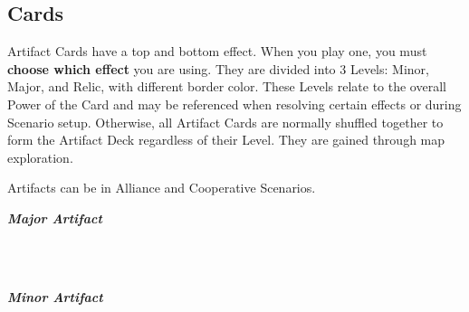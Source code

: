 \begin{multicols*}{2}
\clearpage

\subsection*{ Cards}

Artifact Cards have a top and bottom effect. When you play one, you must \textbf{choose which effect} you are using.
They are divided into 3 Levels: Minor, Major, and Relic, with different border color.
These Levels relate to the overall Power of the Card and may be referenced when resolving certain effects or during Scenario setup.
Otherwise, all Artifact Cards are normally shuffled together to form the Artifact Deck regardless of their Level.
They are gained through map exploration.\par
Artifacts can be  in Alliance and Cooperative Scenarios.\par
\begin{multicols*}{2}
  \begin{scriptsize}
  \end{scriptsize}
  \footnotesize
    \null\hfill\textbf{\textit{\textcolor{darkcandyapplered}{Major Artifact}}}
  \columnbreak
  \begin{center}
    \phantom{\ldots}\\
    \phantom{\ldots}
    \begin{scriptsize}
    \end{scriptsize}\\
    \phantom{\ldots}\textbf{\textit{\textcolor{darkcandyapplered}{Minor Artifact}}}\\
    \vspace{3em}
    \phantom{\ldots}
    \begin{scriptsize}
\end{scriptsize}
\end{center}
\end{multicols*}
\end{multicols*}
